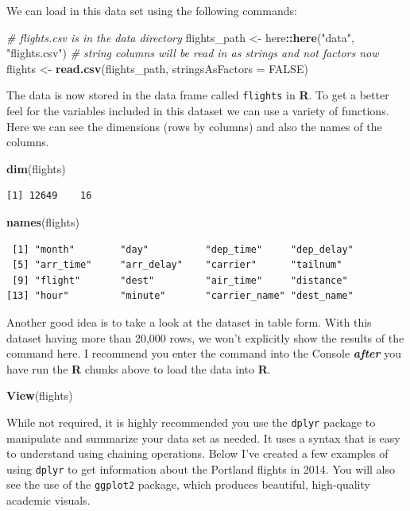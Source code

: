 \documentclass[12pt,twoside]{reedthesis}
\newenvironment{Shaded}{\begin{snugshade}}{\end{snugshade}}
\newcommand{\CommentTok}[1]{\textcolor[rgb]{0.56,0.35,0.01}{\textit{#1}}}
\newcommand{\DataTypeTok}[1]{\textcolor[rgb]{0.13,0.29,0.53}{#1}}
\newcommand{\KeywordTok}[1]{\textcolor[rgb]{0.13,0.29,0.53}{\textbf{#1}}}
\newcommand{\NormalTok}[1]{#1}
\newcommand{\OperatorTok}[1]{\textcolor[rgb]{0.81,0.36,0.00}{\textbf{#1}}}
\newcommand{\OtherTok}[1]{\textcolor[rgb]{0.56,0.35,0.01}{#1}}
\newcommand{\StringTok}[1]{\textcolor[rgb]{0.31,0.60,0.02}{#1}}
\begin{document}
We can load in this data set using the following commands:
\begin{Shaded}
\begin{Highlighting}[]
\CommentTok{# flights.csv is in the data directory}
\NormalTok{flights_path <-}\StringTok{ }\NormalTok{here}\OperatorTok{::}\KeywordTok{here}\NormalTok{(}\StringTok{"data"}\NormalTok{, }\StringTok{"flights.csv"}\NormalTok{)}
\CommentTok{# string columns will be read in as strings and not factors now}
\NormalTok{flights <-}\StringTok{ }\KeywordTok{read.csv}\NormalTok{(flights_path, }\DataTypeTok{stringsAsFactors =} \OtherTok{FALSE}\NormalTok{)}
\end{Highlighting}
\end{Shaded}
The data is now stored in the data frame called \texttt{flights} in \textbf{R}. To get a better feel for the variables included in this dataset we can use a variety of functions. Here we can see the dimensions (rows by columns) and also the names of the columns.
\begin{Shaded}
\begin{Highlighting}[]
\KeywordTok{dim}\NormalTok{(flights)}
\end{Highlighting}
\end{Shaded}
\begin{verbatim}
[1] 12649    16
\end{verbatim}
\begin{Shaded}
\begin{Highlighting}[]
\KeywordTok{names}\NormalTok{(flights)}
\end{Highlighting}
\end{Shaded}
\begin{verbatim}
 [1] "month"        "day"          "dep_time"     "dep_delay"   
 [5] "arr_time"     "arr_delay"    "carrier"      "tailnum"     
 [9] "flight"       "dest"         "air_time"     "distance"    
[13] "hour"         "minute"       "carrier_name" "dest_name"   
\end{verbatim}
Another good idea is to take a look at the dataset in table form. With this dataset having more than 20,000 rows, we won't explicitly show the results of the command here. I recommend you enter the command into the Console \textbf{\emph{after}} you have run the \textbf{R} chunks above to load the data into \textbf{R}.
\begin{Shaded}
\begin{Highlighting}[]
\KeywordTok{View}\NormalTok{(flights)}
\end{Highlighting}
\end{Shaded}
While not required, it is highly recommended you use the \texttt{dplyr} package to manipulate and summarize your data set as needed. It uses a syntax that is easy to understand using chaining operations. Below I've created a few examples of using \texttt{dplyr} to get information about the Portland flights in 2014. You will also see the use of the \texttt{ggplot2} package, which produces beautiful, high-quality academic visuals.
\end{document}
